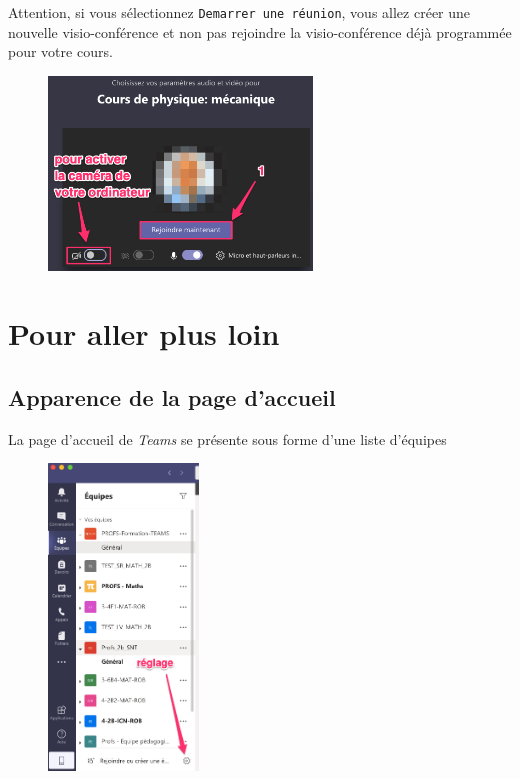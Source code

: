 Attention, si vous sélectionnez \texttt{Demarrer une réunion}, vous allez créer une nouvelle visio-conférence et non pas rejoindre la visio-conférence déjà programmée pour votre cours.

\begin{figure}[H]
\includegraphics[width=7cm]{./images/teams/video2}
\centering
\end{figure}





\section{Pour aller plus loin}
\subsection{Apparence de la page d'accueil}

La page d'accueil de \emph{Teams} se présente sous forme d'une liste d'équipes

\begin{figure}[H]
\includegraphics[width=4cm]{./images/teams/accueil_liste}
\centering
\end{figure}

